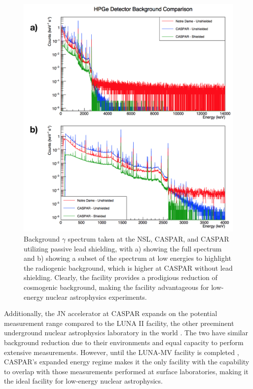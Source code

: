 \begin{figure}
\centering
\includegraphics[width=\linewidth]{figures/casparBackgrounds.png}
\caption{Background $\gamma$ spectrum taken at the NSL, CASPAR, and CASPAR utilizing passive lead shielding, with a) showing the full spectrum and b) showing a subset of the spectrum at low energies to highlight the radiogenic background, which is higher at CASPAR without lead shielding. Clearly, the facility provides a prodigious reduction of cosmogenic background, making the facility advantageous for low-energy nuclear astrophysics experiments.}
\label{fig: backgroundComparison}
\end{figure}



Additionally, the JN accelerator at CASPAR expands on the potential measurement range compared to the LUNA II facility, the other preeminent underground nuclear astrophysics laboratory in the world \cite{Formicola2003a}. The two have similar background reduction due to their environments and equal capacity to perform extensive measurements. However, until the LUNA-MV facility is completed \cite{Broggini2010, Ferraro2018}, CASPAR's expanded energy regime makes it the only facility with the capability to overlap with those measurements performed at surface laboratories, making it the ideal facility for low-energy nuclear astrophysics. 






